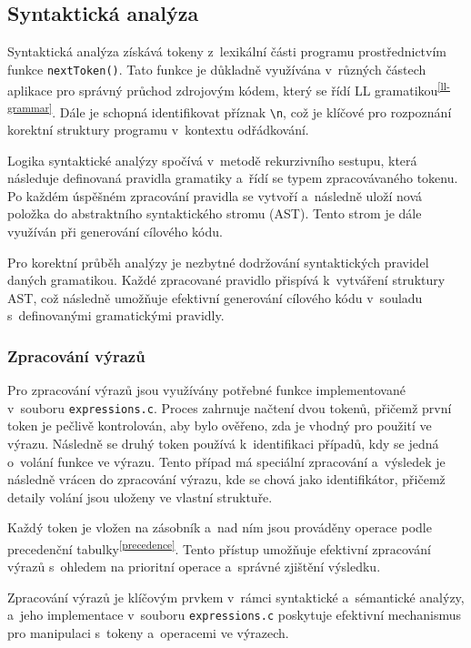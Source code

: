 \documentclass[a4paper, 11pt]{article}
\begin{document}
\subsection{Syntaktická analýza}
    Syntaktická analýza získává tokeny z~lexikální části programu prostřednictvím funkce \texttt{nextToken()}.
    Tato funkce je důkladně využívána v~různých částech aplikace pro správný průchod zdrojovým kódem, který se řídí LL gramatikou\textsuperscript{\ref{ll-grammar}}.
    Dále je schopná identifikovat příznak \verb|\n|, což je klíčové pro rozpoznání korektní struktury programu v~kontextu odřádkování.

    Logika syntaktické analýzy spočívá v~metodě rekurzivního sestupu, která následuje definovaná pravidla gramatiky a~řídí se typem zpracovávaného tokenu.
    Po každém úspěšném zpracování pravidla se vytvoří a~následně uloží nová položka do abstraktního syntaktického stromu (AST).
    Tento strom je dále využíván při generování cílového kódu.

    Pro korektní průběh analýzy je nezbytné dodržování syntaktických pravidel daných gramatikou.
    Každé zpracované pravidlo přispívá k~vytváření struktury AST, což následně umožňuje efektivní generování cílového kódu v~souladu s~definovanými gramatickými pravidly.

\subsubsection{Zpracování výrazů}
    Pro zpracování výrazů jsou využívány potřebné funkce implementované v~souboru \texttt{expressions.c}.
    Proces zahrnuje načtení dvou tokenů, přičemž první token je pečlivě kontrolován, aby bylo ověřeno, zda je vhodný pro použití ve výrazu.
    Následně se druhý token používá k~identifikaci případů, kdy se jedná o~volání funkce ve výrazu.
    Tento případ má speciální zpracování a~výsledek je následně vrácen do zpracování výrazu, kde se chová jako identifikátor, přičemž detaily volání jsou uloženy ve vlastní struktuře.

    Každý token je vložen na zásobník a~nad ním jsou prováděny operace podle precedenční tabulky\textsuperscript{\ref{precedence}}.
    Tento přístup umožňuje efektivní zpracování výrazů s~ohledem na prioritní operace a~správné zjištění výsledku.
    
    Zpracování výrazů je klíčovým prvkem v~rámci syntaktické a~sémantické analýzy, a~jeho implementace v~souboru \texttt{expressions.c} poskytuje efektivní mechanismus pro manipulaci s~tokeny a~operacemi ve výrazech.
\end{document}

